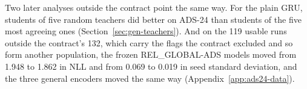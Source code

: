 Two later analyses outside the contract point the same way. For the
plain GRU, students of five random teachers did better on ADS-24 than
students of the five most agreeing ones (Section~\ref{sec:gen-teachers}).
And on the 119 usable runs outside the contract's 132, which carry the
flags the contract excluded and so form another population, the frozen
REL\_GLOBAL-ADS models moved from 1.948 to 1.862 in NLL and from 0.069
to 0.019 in seed standard deviation, and the three general encoders
moved the same way (Appendix~\ref{app:ads24-data}).

